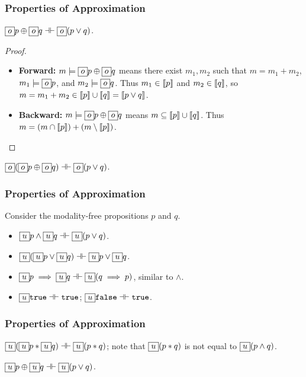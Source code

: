 \begin{frame}[fragile]
    \frametitle{Properties of Approximation}

\begin{lemma} $\boxed{o} p \oplus \boxed{o} q \dashv\vdash \boxed{o} (p \lor q)$.
\end{lemma}
\begin{proof}
    \begin{itemize}
        \item \textbf{Forward:} $m \models \boxed{o} p \oplus \boxed{o} q$ means there exist $m_1, m_2$ such that $m = m_1 + m_2$, $m_1 \models \boxed{o} p$, and $m_2 \models \boxed{o} q$. Thus $m_1 \in \llbracket {p} \rrbracket$ and $m_2 \in \llbracket {q} \rrbracket$, so $m = m_1 + m_2 \in \llbracket {p} \rrbracket \cup \llbracket {q} \rrbracket = \llbracket {p \lor q} \rrbracket$.
        \item \textbf{Backward:} $m \models \boxed{o} p \oplus \boxed{o} q$ means $m \subseteq \llbracket {p} \rrbracket \cup \llbracket {q} \rrbracket$. Thus $m = (m \cap \llbracket {p} \rrbracket) + (m \setminus \llbracket {p} \rrbracket)$.
    \end{itemize}
\end{proof}

\begin{lemma} $\boxed{o}(\boxed{o} p \oplus \boxed{o} q) \dashv\vdash \boxed{o} (p \lor q)$.
\end{lemma}

\end{frame}

\begin{frame}[fragile]
    \frametitle{Properties of Approximation}

\begin{lemma}[Underapproximation] Consider the modality-free propositions $p$ and $q$.
\begin{itemize}
    \item $\boxed{u} p \land \boxed{u} q \dashv\vdash \boxed{u}(p \lor q)$.
    \item $\boxed{u}(\boxed{u} p \lor \boxed{u} q) \dashv\vdash \boxed{u} p \lor \boxed{u} q$.
    \item $\boxed{u} p \implies \boxed{u} q \dashv\vdash \boxed{u}(q \implies p)$, similar to $\land$.
    \item $\boxed{u} {\tt true} \dashv\vdash {\tt true}$; $\boxed{u} {\tt false} \dashv\vdash {\tt true}$.
\end{itemize}
\end{lemma}

\end{frame}

\begin{frame}[fragile]
    \frametitle{Properties of Approximation}

\begin{lemma} $\boxed{u}(\boxed{u} p * \boxed{u} q) \dashv\vdash \boxed{u} (p * q)$; note that $\boxed{u} (p * q)$ is not equal to $\boxed{u} (p \land q)$.
\end{lemma}

\begin{lemma} $\boxed{u} p \oplus \boxed{u} q \dashv\vdash \boxed{u} (p \lor q)$.
\end{lemma}

\end{frame}

